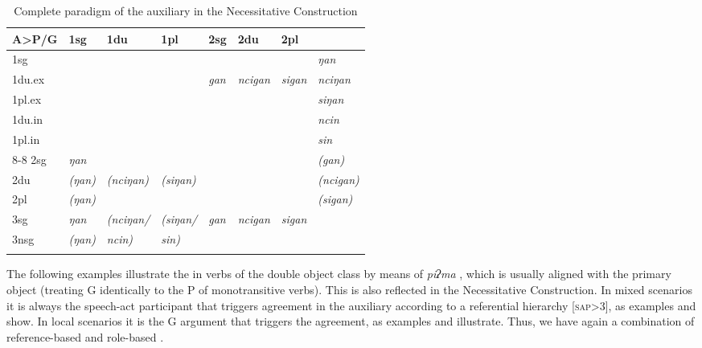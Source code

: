 \begin{table}[htp]
\begin{center}
\begin{tabular}{l|l|l|l|l|l|l|l}
\lsptoprule
{\bf A>P/G} 	&	{\sc 1sg}&	{\sc 1du}& {\sc 1pl} &{\sc 2sg}&{\sc 2du}&{\sc 2pl}&{\sc 3}\\
\hline
{\sc 1sg}  		&\multicolumn{3}{c|}{\cellcolor[gray]{.8}}	& &&				& \it ŋan  \\
{\sc  1du.ex}   &\multicolumn{3}{c|}{\cellcolor[gray]{.8}}	&\it gan&\it ncigan&\it sigan	& \it nciŋan\\
{\sc 1pl.ex}   	&\multicolumn{3}{c|}{\cellcolor[gray]{.8}}	& &&				& \it siŋan \\
\cline{5-7}
{\sc 1du.in}   	&\multicolumn{6}{c|}{\cellcolor[gray]{.8}}				& \it ncin  \\
{\sc 1pl.in}   	&\multicolumn{6}{c|}{\cellcolor[gray]{.8}}	 					& \it sin  \\
\cline{1-4}{8-8}
{\sc 2sg}  		& \it ŋan	& & &\multicolumn{3}{c|}{\cellcolor[gray]{.8}}	& \it (gan) \\
\cline{2-2}
{\sc 2du}  	& \it (ŋan)& \it (nciŋan) &  \it (siŋan)	&\multicolumn{3}{c|}{\cellcolor[gray]{.8}}&  \it (ncigan) \\
{\sc 2pl}  	& \it (ŋan) &  &	&\multicolumn{3}{c|}{\cellcolor[gray]{.8}}			&  \it (sigan) \\
\hline
{\sc 3sg}  	& \it ŋan	&  \it (nciŋan/&\it (siŋan/	 & \it gan&\it ncigan&\it  sigan&\cellcolor[gray]{.8}\\
\cline{2-2}
{\sc 3nsg}  &  \it (ŋan)&\it ncin)  & 	\it sin)				&&&			&\cellcolor[gray]{.8} \\
\lspbottomrule
\end{tabular}
\caption{Complete paradigm of the auxiliary in the Necessitative Construction}\label{cop-agree}
\end{center}
\end{table}
 	
The following examples illustrate the  in verbs of the double object class by means of  \emph{piʔma} , which is usually aligned with the primary object (treating G identically to the P of monotransitive verbs). This is also reflected in the Necessitative Construction. In mixed scenarios  it is always the speech-act participant that triggers agreement in the auxiliary according to a referential hierarchy [\textsc{sap}>3], as examples \Next[a] and \Next[b] show. In local scenarios it is the G argument that triggers the agreement, as examples \Next[c] and \Next[d] illustrate. Thus, we have again a combination of reference-based and role-based . 
 
